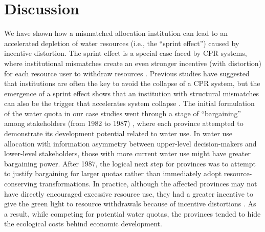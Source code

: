 \documentclass{article}
\begin{document}
\section{Discussion}
We have shown how a mismatched allocation institution can lead to an accelerated depletion of water resources (i.e., the “sprint effect”) caused by incentive distortion. The sprint effect is a special case faced by CPR systems, where institutional mismatches create an even stronger incentive (with distortion) for each resource user to withdraw resources
\cite{ostromRevisitingCommonsLocal1999,ostromGeneralFrameworkAnalyzing2009,castilla-rhoSocialtippingpoints2017}.
Previous studies have suggested that institutions are often the key to avoid the collapse of a CPR system, but the emergence of a sprint effect shows that an institution with structural mismatches can also be the trigger that accelerates system collapse \cite{bodinConservationSuccessFunction2014,bodinCollaborativeenvironmentalgovernance2017,wangAlignmentsocialecological2019}.
The initial formulation of the water quota in our case studies went through a stage of “bargaining” among stakeholders (from 1982 to 1987) \cite{wangReviewImplementationYellow2019, wangThingsCurrentSignificance2019}, where each province attempted to demonstrate its development potential related to water use.
In water use allocation with information asymmetry between upper-level decision-makers and lower-level stakeholders, those with more current water use might have greater bargaining power. After 1987, the logical next step for provinces was to attempt to justify bargaining for larger quotas rather than immediately adopt resource-conserving transformations. In practice, although the affected provinces may not have directly encouraged excessive resource use, they had a greater incentive to give the green light to resource withdrawals because of incentive distortions \cite{kriegerProgressGroundWater1955, ostromGoverningCommonsEvolution1990}. As a result, while competing for potential water quotas, the provinces tended to hide the ecological costs behind economic development.
\end{document}
